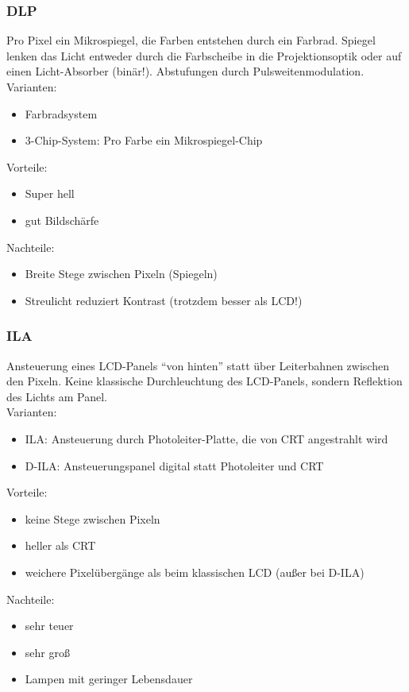 \documentclass[a4paper, 12pt]{article}
\begin{document}
\subsubsection*{DLP}
Pro Pixel ein Mikrospiegel, die Farben entstehen durch ein Farbrad. Spiegel lenken das Licht entweder durch die Farbscheibe in die Projektionsoptik oder auf einen Licht-Absorber (binär!). Abstufungen durch Pulsweitenmodulation.\\
Varianten:
\begin{itemize}
  \item Farbradsystem
  \item 3-Chip-System: Pro Farbe ein Mikrospiegel-Chip
\end{itemize}
Vorteile:
\begin{itemize}
  \item Super hell
  \item gut Bildschärfe
\end{itemize}
Nachteile:
\begin{itemize}
  \item Breite Stege zwischen Pixeln (Spiegeln)
  \item Streulicht reduziert Kontrast (trotzdem besser als LCD!)
\end{itemize}

\subsubsection*{ILA}
Ansteuerung eines LCD-Panels ``von hinten'' statt über Leiterbahnen zwischen den Pixeln. Keine klassische Durchleuchtung des LCD-Panels, sondern Reflektion des Lichts am Panel.\\
Varianten:
\begin{itemize}
  \item ILA: Ansteuerung durch Photoleiter-Platte, die von CRT angestrahlt wird
  \item D-ILA: Ansteuerungspanel digital statt Photoleiter und CRT
\end{itemize}
Vorteile:
\begin{itemize}
  \item keine Stege zwischen Pixeln
  \item heller als CRT
  \item weichere Pixelübergänge als beim klassischen LCD (außer bei D-ILA)
\end{itemize}
Nachteile:
\begin{itemize}
  \item sehr teuer
  \item sehr groß
  \item Lampen mit geringer Lebensdauer
\end{itemize}
\end{document}
